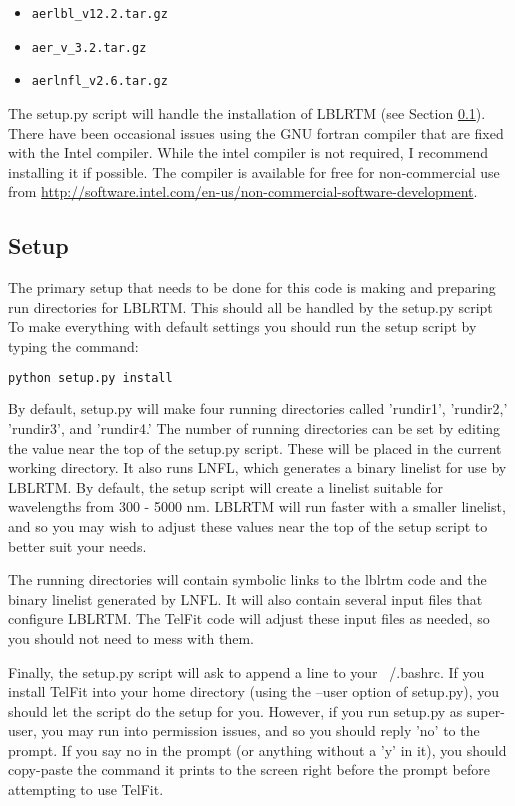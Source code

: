 \documentclass{article}
\begin{document}
\begin{itemize}
\item \verb|aerlbl_v12.2.tar.gz|
\item \verb|aer_v_3.2.tar.gz|
\item \verb|aerlnfl_v2.6.tar.gz|
\end{itemize}

The setup.py script will handle the installation of LBLRTM (see Section \ref{sec:setup}). There have been occasional issues using the GNU fortran compiler that are fixed with the Intel compiler. While the intel compiler is not required, I recommend installing it if possible. The compiler is available for free for non-commercial use from \url{http://software.intel.com/en-us/non-commercial-software-development}.



\subsection{Setup}
\label{sec:setup}

The primary setup that needs to be done for this code is making and preparing run directories for LBLRTM. This should all be handled by the setup.py script To make everything with default settings you should run the setup script by typing the command:
\begin{lstlisting}[language=bash]
   python setup.py install
\end{lstlisting}

By default, setup.py will make four running directories called 'rundir1', 'rundir2,' 'rundir3', and 'rundir4.' The number of running directories can be set by editing the value near the top of the setup.py script. These will be placed in the current working directory.  It also runs LNFL, which generates a binary linelist for use by LBLRTM. By default, the setup script will create a linelist suitable for wavelengths from 300 - 5000 nm. LBLRTM will run faster with a smaller linelist, and so you may wish to adjust these values near the top of the setup script to better suit your needs.

The running directories will contain symbolic links to the lblrtm code and the binary linelist generated by LNFL. It will also contain several input files that configure LBLRTM. The TelFit code will adjust these input files as needed, so you should not need to mess with them.

Finally, the setup.py script will ask to append a line to your ~/.bashrc. If you install TelFit into your home directory (using the --user option of setup.py), you should let the script do the setup for you. However, if you run setup.py as super-user, you may run into permission issues, and so you should reply 'no' to the prompt. If you say no in the prompt (or anything without a 'y' in it), you should copy-paste the command it prints to the screen right before the prompt before attempting to use TelFit. 
\end{document}
